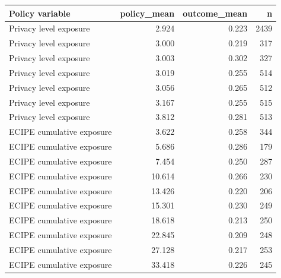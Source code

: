 \begin{tabular}{lrrr}
\toprule
Policy variable & policy_mean & outcome_mean & n \\
\midrule
Privacy level exposure & 2.924 & 0.223 & 2439 \\
Privacy level exposure & 3.000 & 0.219 & 317 \\
Privacy level exposure & 3.003 & 0.302 & 327 \\
Privacy level exposure & 3.019 & 0.255 & 514 \\
Privacy level exposure & 3.056 & 0.265 & 512 \\
Privacy level exposure & 3.167 & 0.255 & 515 \\
Privacy level exposure & 3.812 & 0.281 & 513 \\
ECIPE cumulative exposure & 3.622 & 0.258 & 344 \\
ECIPE cumulative exposure & 5.686 & 0.286 & 179 \\
ECIPE cumulative exposure & 7.454 & 0.250 & 287 \\
ECIPE cumulative exposure & 10.614 & 0.266 & 230 \\
ECIPE cumulative exposure & 13.426 & 0.220 & 206 \\
ECIPE cumulative exposure & 15.301 & 0.230 & 249 \\
ECIPE cumulative exposure & 18.618 & 0.213 & 250 \\
ECIPE cumulative exposure & 22.845 & 0.209 & 248 \\
ECIPE cumulative exposure & 27.128 & 0.217 & 253 \\
ECIPE cumulative exposure & 33.418 & 0.226 & 245 \\
\bottomrule
\end{tabular}
